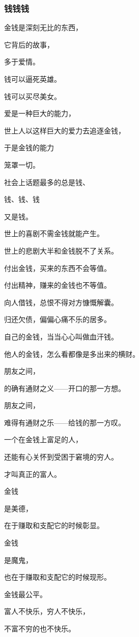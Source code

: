 \subsubsection{钱钱钱}


\par 金钱是深刻无比的东西，
\par 它背后的故事，
\par 多于爱情。
\par 
\par 钱可以逼死英雄。
\par 钱可以买尽美女。
\par 
\par 爱是一种巨大的能力，
\par 世上人以这样巨大的爱力去追逐金钱，
\par 于是金钱的能力
\par 笼罩一切。
\par 
\par 社会上话题最多的总是钱、
\par 钱、钱、钱
\par 又是钱。
\par 
\par 世上的喜剧不需金钱就能产生。
\par 世上的悲剧大半和金钱脱不了关系。
\par 
\par 付出金钱，买来的东西不会等值。
\par 付出精神，赚来的金钱也不等值。
\par 
\par 向人借钱，总恨不得对方慷慨解囊。
\par 归还欠债，偏偏心痛不乐的居多。
\par 自己的金钱，当当心心叫做血汗钱。
\par 他人的金钱，怎么看都像是多出来的横财。
\par 
\par 朋友之间，
\par 的确有通财之义——开口的那一方想。
\par 朋友之间，
\par 难得有通财之乐——给钱的那一方叹。
\par 
\par 一个在金钱上富足的人，
\par 还能有心关怀到受困于窘境的穷人。
\par 才叫真正的富人。
\par 
\par 金钱
\par 是美德，
\par 在于赚取和支配它的时候彰显。
\par 金钱
\par 是魔鬼，
\par 也在于赚取和支配它的时候现形。
\par 
\par 金钱最公平。
\par 富人不快乐，穷人不快乐，
\par 不富不穷的也不快乐。



